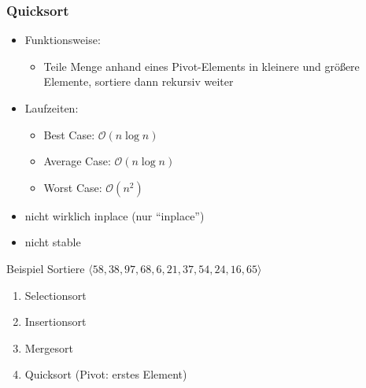 \begin{frame}
	\frametitle{Quicksort}
	\begin{itemize}
		\item Funktionsweise:
		\begin{itemize}
			\item Teile Menge anhand eines Pivot-Elements in kleinere und größere Elemente, sortiere dann rekursiv weiter
		\end{itemize}
		\item Laufzeiten:
		\begin{itemize}
			\item Best Case: $\mathcal{O}(n \log{n})$
			\item Average Case: $\mathcal{O}(n \log{n})$
			\item Worst Case: $\mathcal{O}(n^2)$
		\end{itemize}
		\item {\color{red} nicht wirklich inplace} (nur "`inplace"')
		\item {\color{red} nicht stable}
	\end{itemize}
\end{frame}

\begin{frame}{Beispiel}
	Sortiere $\langle 58, 38, 97, 68, 6, 21, 37, 54, 24, 16, 65\rangle$

	\begin{enumerate}
		\item Selectionsort
		\item Insertionsort
		\item Mergesort
		\item Quicksort (Pivot: erstes Element)
	\end{enumerate}
\end{frame}

